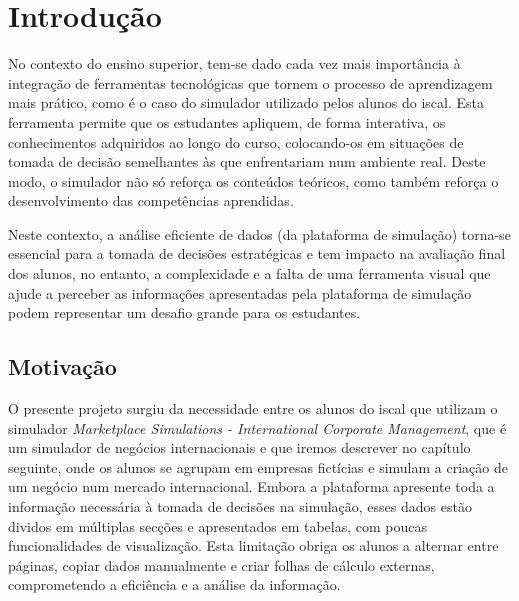 

\chapter{Introdução}
\label{ch:introducao}

No contexto do ensino superior, tem-se dado cada vez mais importância à integração de ferramentas tecnológicas que tornem o processo de aprendizagem mais prático, como é o caso do simulador utilizado pelos alunos do \gls{iscal}. Esta ferramenta permite que os estudantes apliquem, de forma interativa, os conhecimentos adquiridos ao longo do curso, colocando-os em situações de tomada de decisão semelhantes às que enfrentariam num ambiente real. Deste modo, o simulador não só reforça os conteúdos teóricos, como também reforça o desenvolvimento das competências aprendidas. 

Neste contexto, a análise eficiente de dados (da plataforma de simulação) torna-se essencial para a tomada de decisões estratégicas e tem impacto na avaliação final dos alunos, no entanto, a complexidade e a falta de uma ferramenta visual que ajude a perceber as informações apresentadas pela plataforma de simulação podem representar um desafio grande para os estudantes.

\section{Motivação}
O presente projeto surgiu da necessidade  entre os alunos do \gls{iscal} que utilizam o simulador \textit{Marketplace Simulations - International Corporate Management}, que é um simulador de negócios internacionais e que iremos descrever no capítulo seguinte, onde os alunos se agrupam em empresas fictícias e simulam a criação de um negócio num mercado internacional. Embora a plataforma apresente toda a informação necessária à tomada de decisões na simulação, esses dados estão dividos em múltiplas secções e apresentados em tabelas, com poucas funcionalidades de visualização. Esta limitação obriga os alunos a alternar entre páginas, copiar dados manualmente e criar folhas de cálculo externas, comprometendo a eficiência e a análise da informação.

